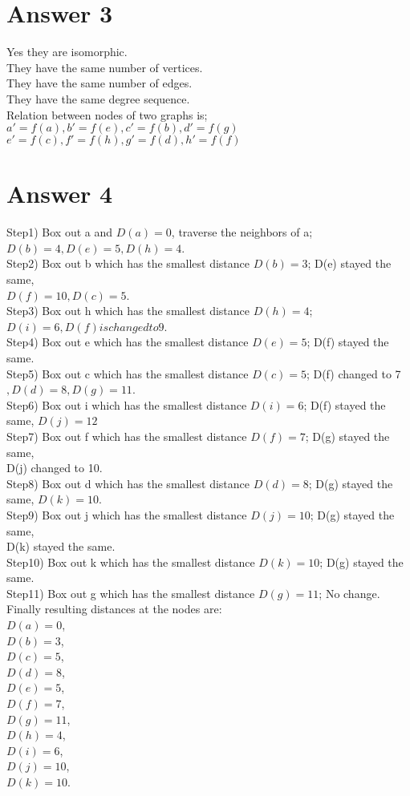 \documentclass[12pt]{article}
\begin{document}
\section*{Answer 3}
Yes they are isomorphic. \\
They have the same number of vertices.\\
They have the same number of edges.\\
They have the same degree sequence.\\
Relation between nodes of two graphs is;\\
$a' = f(a), b' = f(e), c' = f(b), d' = f(g)$\\
$e' = f(c), f' = f(h) ,g' = f(d), h' = f(f)$\\

\newpage
\section*{Answer 4}
Step1) Box out a and $D(a)=0$, traverse the neighbors of a; $D(b)=4, D(e)=5, D(h)=4$. \\
Step2) Box out b which has the smallest distance $D(b)=3$; D(e) stayed the same,\\ $D(f)=10, D(c)=5$. \\
Step3) Box out h which has the smallest distance $D(h)=4$; $D(i)=6, D(f) is changed to 9$. \\
Step4) Box out e which has the smallest distance $D(e)=5$; D(f) stayed the same. \\
Step5) Box out c which has the smallest distance $D(c)=5$; D(f) changed to 7$, D(d)=8, D(g)=11$. \\
Step6) Box out i which has the smallest distance $D(i)=6$; D(f) stayed the same, $D(j)=12$ \\
Step7) Box out f which has the smallest distance $D(f)=7$; D(g) stayed the same, \\D(j) changed to 10. \\
Step8) Box out d which has the smallest distance $D(d)=8$; D(g) stayed the same, $D(k)=10$. \\
Step9) Box out j which has the smallest distance $D(j)=10$; D(g) stayed the same, \\ D(k) stayed the same. \\
Step10) Box out k which has the smallest distance $D(k)=10$; D(g) stayed the same. \\
Step11) Box out g which has the smallest distance $D(g)=11$; No change.
Finally resulting distances at the nodes are: \\
$D(a) = 0$, \\
$D(b) = 3$, \\
$D(c) = 5$, \\
$D(d) = 8$, \\
$D(e) = 5$, \\
$D(f) = 7$,\\
$D(g) = 11$, \\
$D(h) = 4$, \\
$D(i) = 6$, \\
$D(j) = 10$, \\
$D(k) = 10$. \\
\end{document}
